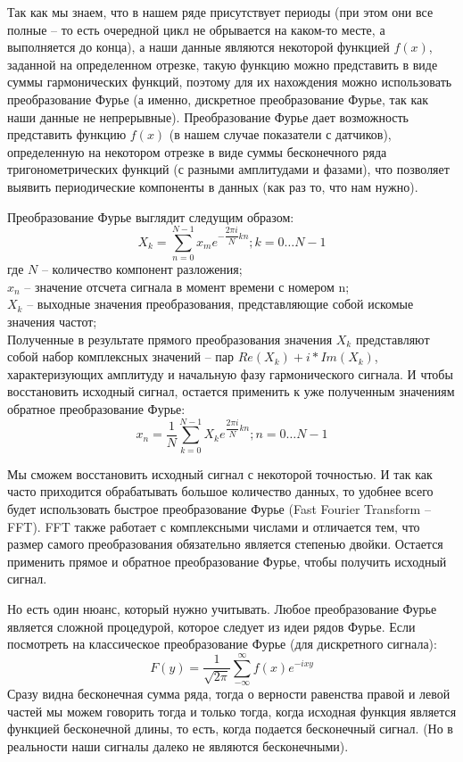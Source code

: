 Так как мы знаем, что в нашем ряде присутствует периоды (при этом они все полные – то есть очередной цикл не обрывается на каком-то месте, а выполняется до конца), а наши данные являются некоторой функцией $f(x)$, заданной на определенном отрезке, такую функцию можно представить в виде суммы гармонических функций, поэтому для их нахождения можно использовать преобразование Фурье (а именно, дискретное преобразование Фурье, так как наши данные не непрерывные). Преобразование Фурье
дает возможность представить функцию $f(x)$ (в нашем случае показатели с датчиков), определенную на некотором отрезке в виде суммы бесконечного ряда тригонометрических функций (с разными амплитудами и фазами), что позволяет выявить периодические компоненты в данных (как раз то, что нам нужно).

Преобразование Фурье выглядит следущим образом:
\[X_k = \sum_{n = 0}^{N - 1} x_m e^{- \dfrac{2 \pi i}{N} kn}; k = 0 \ldots N - 1\]
где $N$ -- количество компонент разложения; \\
$x_n$ -- значение отсчета сигнала в момент времени с номером n; \\
$X_k$ -- выходные значения преобразования, представляющие собой искомые значения частот; \\

Полученные в результате прямого преобразования значения $X_k$ представляют собой набор комплексных значений -- пар $Re(X_k) + i*Im(X_k)$, характеризующих амплитуду и начальную фазу гармонического сигнала. И чтобы восстановить исходный сигнал, остается применить к уже полученным значениям обратное преобразование Фурье:
\[x_n = \dfrac{1}{N} \sum_{k = 0}^{N-1} X_k e^{\dfrac{2 \pi i}{N} kn}; n = 0 \ldots N-1\]

Мы сможем восстановить исходный сигнал с некоторой точностью. И так как часто приходится обрабатывать большое количество данных, то удобнее всего будет использовать быстрое преобразование Фурье (Fast Fourier Transform -- FFT). FFT также работает с комплексными числами и отличается тем, что размер самого преобразования обязательно является степенью двойки. Остается применить прямое и обратное преобразование Фурье, чтобы получить исходный сигнал.

Но есть один нюанс, который нужно учитывать. Любое преобразование Фурье является сложной процедурой, которое следует из идеи рядов Фурье. Если посмотреть на классическое преобразование Фурье (для дискретного сигнала):
\[F(y) = \dfrac{1}{\sqrt{2 \pi}} \sum_{- \infty}^{\infty} f(x) e^{-i x y}\]
Сразу видна бесконечная сумма ряда, тогда о верности равенства правой и левой частей мы можем говорить тогда и только тогда, когда исходная функция является функцией бесконечной длины, то есть, когда подается бесконечный сигнал. (Но в реальности наши сигналы далеко не являются бесконечными).

